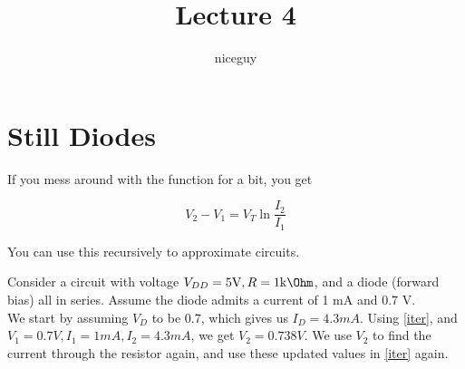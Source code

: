 \documentclass[12pt]{article}
\title{Lecture 4}
\author{niceguy}
\begin{document}
\maketitle

\section{Still Diodes}

If you mess around with the function for a bit, you get

\begin{equation}\label{iter}
    V_2 - V_1 = V_T\ln\frac{I_2}{I_1}
\end{equation}

You can use this recursively to approximate circuits.

\begin{ex}
    Consider a circuit with voltage $V_{DD} = 5\unit{V}, R = 1\unit{k\Ohm}$, and a diode (forward bias) all in series. Assume the diode admits a current of 1 mA and 0.7 V. \\
    We start by assuming $V_D$ to be 0.7, which gives us $I_D = 4.3\unit{mA}$. Using \ref{iter}, and $V_1 = 0.7\unit{V}, I_1 = 1\unit{mA}, I_2 = 4.3\unit{mA}$, we get $V_2 = 0.738\unit{V}$. We use $V_2$ to find the current through the resistor again, and use these updated values in \ref{iter} again.
\end{ex}
\end{document}
